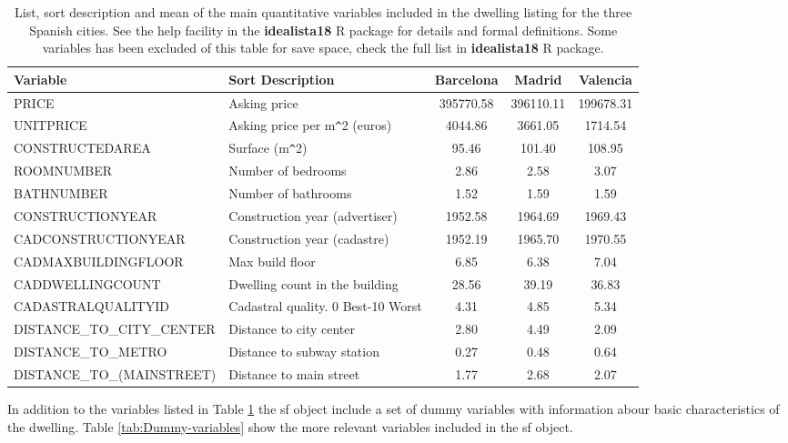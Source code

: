\documentclass[Royal,times,sageh]{sagej}
\begin{document}
\begin{table}[ht]
\centering
\fontsize{8}{10}\selectfont
\begin{tabular}{>{\raggedright\arraybackslash}p{13em}>{\raggedright\arraybackslash}p{14em}ccc}
  \hline
Variable & Sort Description & Barcelona & Madrid & Valencia \\ 
  \hline
PRICE & Asking price & 395770.58 & 396110.11 & 199678.31 \\ 
  UNITPRICE & Asking price per m\verb|^|2 (euros) & 4044.86 & 3661.05 & 1714.54 \\ 
  CONSTRUCTEDAREA & Surface (m\verb|^|2) & 95.46 & 101.40 & 108.95 \\ 
  ROOMNUMBER & Number of bedrooms & 2.86 & 2.58 & 3.07 \\ 
  BATHNUMBER & Number of bathrooms & 1.52 & 1.59 & 1.59 \\ 
  CONSTRUCTIONYEAR & Construction year (advertiser) & 1952.58 & 1964.69 & 1969.43 \\ 
  CADCONSTRUCTIONYEAR & Construction year (cadastre) & 1952.19 & 1965.70 & 1970.55 \\ 
  CADMAXBUILDINGFLOOR & Max build floor & 6.85 & 6.38 & 7.04 \\ 
  CADDWELLINGCOUNT & Dwelling count in the building & 28.56 & 39.19 & 36.83 \\ 
  CADASTRALQUALITYID & Cadastral quality. 0 Best-10 Worst & 4.31 & 4.85 & 5.34 \\ 
  DISTANCE\_TO\_CITY\_CENTER & Distance to city center & 2.80 & 4.49 & 2.09 \\ 
  DISTANCE\_TO\_METRO & Distance to subway station & 0.27 & 0.48 & 0.64 \\ 
  DISTANCE\_TO\_(MAINSTREET) & Distance to main street & 1.77 & 2.68 & 2.07 \\ 
   \hline
\end{tabular}
\caption{List, sort description and mean of the main quantitative variables included in the dwelling listing for the three Spanish cities. See the help facility in the \textbf{idealista18} R package for details and formal definitions. Some variables has been excluded of this table for save space, check the full list in  \textbf{idealista18} R package. \label{tab:variables}} 
\end{table}

In addition to the variables listed in Table \ref{tab:variables} the sf
object include a set of dummy variables with information abour basic
characteristics of the dwelling. Table \ref{tab:Dummy-variables} show
the more relevant variables included in the sf object.
\end{document}
